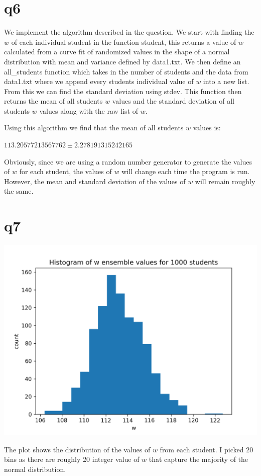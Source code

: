 \documentclass[a4paper,english]{article}
\begin{document}
    \section{q6}
        
        We implement the algorithm described in the question. We start with finding the $w$ of each individual student in the function student, this returns a value of $w$ calculated from a curve fit of randomized values in the shape of a normal distribution with mean and variance defined by data1.txt. \newline
        We then define an all\_students function which takes in the number of students and the data from data1.txt where we append every students individual value of $w$ into a new list. From this we can find the standard deviation using stdev. \newline
        This function then returns the mean of all students $w$ values and the standard deviation of all students $w$ values along with the raw list of $w$. \newline

        Using this algorithm we find that the mean of all students $w$ values is: 
        \begin{center}
            $113.20577213567762 \pm 2.278191315242165$
        \end{center}
        Obviously, since we are using a random number generator to generate the values of $w$ for each student, the values of $w$ will change each time the program is run. However, the mean and standard deviation of the values of $w$ will remain roughly the same.
    
    \section{q7}
        \begin{center}
        \includegraphics[scale=0.8]{./2_7.png}
        \end{center}
        The plot shows the distribution of the values of $w$ from each student.
        I picked 20 bins as there are roughly 20 integer value of $w$ that capture the majority of the normal distribution.
\end{document}
